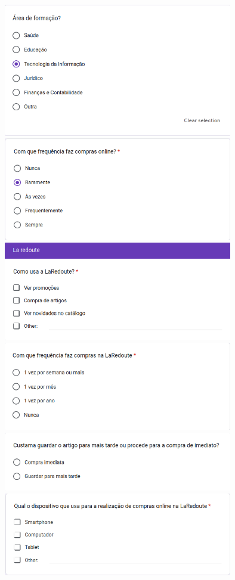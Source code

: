 \documentclass[a4paper,12pt]{article}
\begin{document}
\begin{center}
    \includegraphics[width=0.75\textwidth]{form/04questao_formacao.png}
    \includegraphics[width=0.75\textwidth]{form/05questao_comprasonline.png}
    \includegraphics[width=0.75\textwidth]{form/06questao_usolaredoute.png}
    \includegraphics[width=0.75\textwidth]{form/07questao_frequencialaredoute.png}
    \includegraphics[width=0.75\textwidth]{form/08questao_guardarparatarde.png}
    \includegraphics[width=0.75\textwidth]{form/09questao_dispositivocompra.png}

\end{center}
\end{document}
